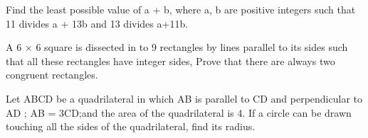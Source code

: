 \item Find the least possible value of a + b, where a, b are positive integers such that 11 divides a + 13b and 13 divides a+11b.

\item A 6 $\times$ 6 square is dissected in to 9 rectangles by lines parallel to its sides such that all these rectangles have integer sides, Prove that there are always two congruent rectangles.

\item Let ABCD be a quadrilateral in which AB is parallel to CD and perpendicular to AD ; AB = 3CD;and the area of the quadrilateral is 4. If a circle can be drawn touching all the sides of the quadrilateral, find its radius.
